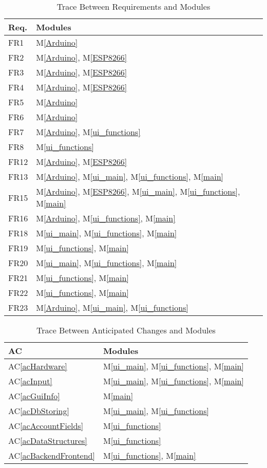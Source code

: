 \documentclass[12pt, titlepage]{article}
\newcommand{\acref}[1]{AC\ref{#1}}
\newcommand{\mref}[1]{M\ref{#1}}
\begin{document}
\begin{table}[H]
\centering
\begin{tabular}{p{} p{}}
\toprule
\textbf{Req.} & \textbf{Modules}\\
\midrule
FR1 & \mref{Arduino}\\
FR2 & \mref{Arduino}, \mref{ESP8266}\\
FR3 & \mref{Arduino}, \mref{ESP8266}\\
FR4 & \mref{Arduino}, \mref{ESP8266}\\
FR5 & \mref{Arduino}\\
FR6 & \mref{Arduino}\\
FR7 & \mref{Arduino}, \mref{ui_functions}\\
FR8 & \mref{ui_functions}\\
FR12 & \mref{Arduino}, \mref{ESP8266}\\
FR13 & \mref{Arduino}, \mref{ui_main}, \mref{ui_functions}, \mref{main}\\
FR15 & \mref{Arduino}, \mref{ESP8266}, \mref{ui_main}, \mref{ui_functions}, \mref{main}\\
FR16 & \mref{Arduino}, \mref{ui_functions}, \mref{main}\\
FR18 & \mref{ui_main}, \mref{ui_functions}, \mref{main}\\
FR19 & \mref{ui_functions}, \mref{main}\\
FR20 & \mref{ui_main}, \mref{ui_functions}, \mref{main}\\
FR21 & \mref{ui_functions}, \mref{main}\\
FR22 & \mref{ui_functions}, \mref{main}\\
FR23 & \mref{Arduino}, \mref{ui_main}, \mref{ui_functions}\\
\bottomrule
\end{tabular}
\caption{Trace Between Requirements and Modules}
\label{TblRT}
\end{table}

\begin{table}[H]
\centering
\begin{tabular}{p{} p{}}
\toprule
\textbf{AC} & \textbf{Modules}\\
\midrule
\acref{acHardware} & \mref{ui_main}, \mref{ui_functions}, \mref{main}\\
\acref{acInput} & \mref{ui_main}, \mref{ui_functions}, \mref{main}\\
\acref{acGuiInfo} & \mref{main}\\
\acref{acDbStoring} & \mref{ui_main}, \mref{ui_functions}\\
\acref{acAccountFields} & \mref{ui_functions}\\
\acref{acDataStructures} & \mref{ui_functions}\\
\acref{acBackendFrontend} & \mref{ui_functions}, \mref{main}\\

\bottomrule
\end{tabular}
\caption{Trace Between Anticipated Changes and Modules}
\label{TblACT}
\end{table}

\newpage{}
\end{document}
